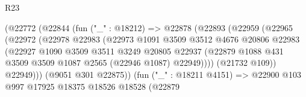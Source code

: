 \begin{lexlean}{R23}
\begin{coremodule}
                                    (@22772
                                      (@22844
                                        (fun ("_" : @18212) =>
                                        @22878
                                          (@22893
                                            (@22959
                                              (@22965
                                                (@22972
                                                  (@22978
                                                    @22983
                                                    (@22973
                                                      @1091
                                                      @3509
                                                      @3512
                                                      @4676
                                                      @20806
                                                      @22983
                                                      (@22927
                                                        @1090
                                                        @3509
                                                        @3511
                                                        @3249
                                                        @20805
                                                        @22937
                                                        (@22879
                                                          @1088
                                                          @431
                                                          @3509
                                                          @3509
                                                          @1087
                                                          @2565
                                                          (@22946 @1087)
                                                          @22949))))
                                                  (@21732 @109))
                                                @22949)))
                                          (@9051 @301 @22875))
                                        (fun ("_" : @18211 @4151) =>
                                        @22900
                                          @103
                                          @997
                                          @17925
                                          @18375
                                          @18526
                                          @18528
                                          (@22879

\end{coremodule}
\end{lexlean}
